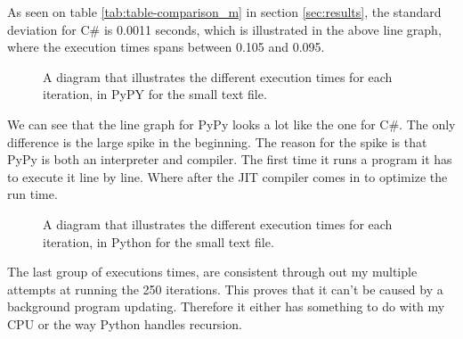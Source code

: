 \noindent As seen on table \ref{tab:table-comparison_m} in section \ref{sec:results}, the standard deviation for C\# is 0.0011 seconds, which is illustrated in the above line graph, where the execution times spans between 0.105 and 0.095.

\begin{figure}[H]
    \vspace*{-0.8cm}
    \caption{A diagram that illustrates the different execution times for each iteration, in PyPY for the small text file.}
\end{figure}

\noindent We can see that the line graph for PyPy looks a lot like the one for C\#. The only difference is the large spike in the beginning. The reason for the spike is that PyPy is both an interpreter and compiler. The first time it runs a program it has to execute it line by line. Where after the JIT compiler comes in to optimize the run time\cite{pypy_org}. 

\begin{figure}[H]
    \vspace*{-0.8cm}
    \caption{A diagram that illustrates the different execution times for each iteration, in Python for the small text file.}
\end{figure}

\noindent The last group of executions times, are consistent through out my multiple attempts at running the 250 iterations. This proves that it can't be caused by a background program updating. Therefore it either has something to do with my CPU or the way Python handles recursion. 

